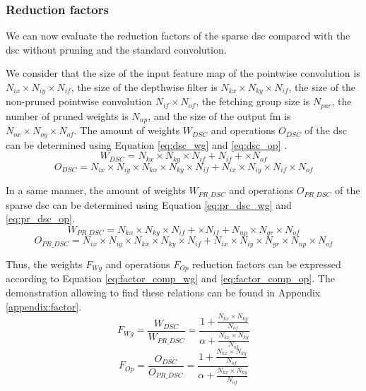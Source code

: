 \subsubsection{Reduction factors}
%
We can now evaluate the reduction factors of the sparse \acrshort{dsc} compared with the \acrshort{dsc} without pruning and the standard convolution.

We consider that the size of the input feature map of the pointwise convolution is $N_{ix}  \times N_{iy} \times N_{if}$, the size of the depthwise filter is $N_{kx} \times N_{ky} \times N_{if}$, the size of the non-pruned pointwise convolution $N_{if} \times N_{of}$, the fetching group size is $N_{par}$, the number of pruned weights is $N_{np}$, and the size of the output \acrshort{fm} is $N_{ox}  \times N_{oy} \times N_{of}$. The amount of weights $W_{DSC}$ and operations $O_{DSC}$ of the \acrshort{dsc} can be determined using Equation \eqref{eq:dsc_wg} and \eqref{eq:dsc_op} \cite{bai_cnn_2018, liu_fpga-based_2019}.
%
\begin{equation}
    W_{DSC} = N_{kx} \times N_{ky} \times N_{if} + N_{if} + \times N_{of}
    \label{eq:dsc_wg}
\end{equation}
%
\begin{equation}
    O_{DSC} = N_{ix} \times N_{iy} \times N_{kx} \times N_{ky} \times N_{if} + N_{ix} \times N_{iy} \times N_{if} \times N_{of}
    \label{eq:dsc_op}
\end{equation}

In a same manner, the amount of weights $W_{PR\_DSC}$ and operations $O_{PR\_DSC}$ of the sparse \acrshort{dsc} can be determined using Equation \eqref{eq:pr_dsc_wg} and \eqref{eq:pr_dsc_op}.
%
\begin{equation}
    W_{PR\_DSC} = N_{kx} \times N_{ky} \times N_{if} + \times N_{if} + N_{np} \times N_{gr} \times N_{of}
    \label{eq:pr_dsc_wg}
\end{equation}
%
\begin{equation}
    O_{PR\_DSC} = N_{ix} \times N_{iy} \times N_{kx} \times N_{ky} \times N_{if} + N_{ix} \times N_{iy} \times N_{gr} \times N_{np} \times N_{of}
    \label{eq:pr_dsc_op}
\end{equation}

Thus, the weights $F_{Wg}$ and operations $F_{Op}$ reduction factors can be expressed according to Equation \eqref{eq:factor_comp_wg} and \eqref{eq:factor_comp_op}. The demonstration allowing to find these relations can be found in Appendix \ref{appendix:factor}.
%
\begin{equation}
    F_{Wg} = \frac{W_{DSC}}{W_{PR\_DSC}} = \frac{1 + \frac{N_{kx} \times N_{ky}} {N_{of}}} {\alpha + \frac{N_{kx} \times N_{ky}} {N_{of}}}
    \label{eq:factor_comp_wg}
\end{equation}
\begin{equation}
    F_{Op} = \frac{O_{DSC}}{O_{PR\_DSC}} = \frac{1 + \frac{N_{kx} \times N_{ky}} {N_{of}}} {\alpha + \frac{N_{kx} \times N_{ky}} {N_{of}}}
    \label{eq:factor_comp_op}
\end{equation}


